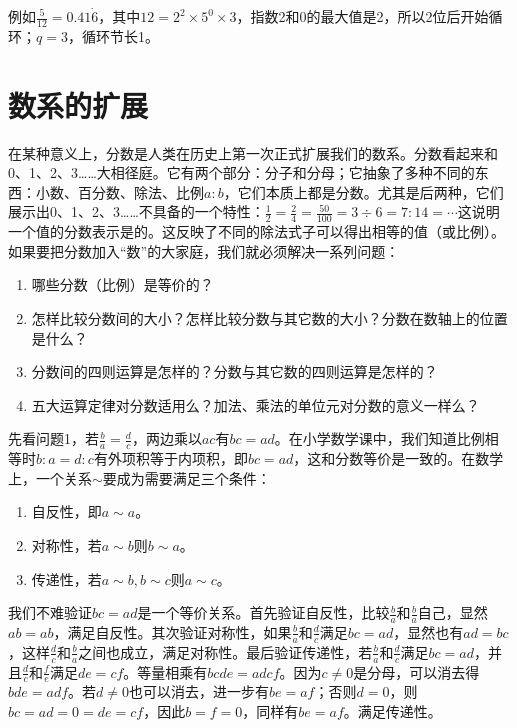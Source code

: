 \documentclass[b5paper]{ctexart}
\begin{document}
例如$\frac{5}{12} = 0.41\dot{6}$，其中$12 = 2^2 \times 5^0 \times 3$，指数2和0的最大值是2，所以2位后开始循环；$q = 3$，循环节长1。

\section{数系的扩展}
在某种意义上，分数是人类在历史上第一次正式扩展我们的数系。分数看起来和0、1、2、3……大相径庭。它有两个部分：分子和分母；它抽象了多种不同的东西：小数、百分数、除法、比例$a:b$，它们本质上都是分数。尤其是后两种，它们展示出0、1、2、3……不具备的一个特性：$\frac{1}{2} = \frac{2}{4} = \frac{50}{100} = 3 \div 6 = 7:14 = \cdots$这说明一个值的分数表示是的。这反映了不同的除法式子可以得出相等的值（或比例）。如果要把分数加入“数”的大家庭，我们就必须解决一系列问题：

\begin{enumerate}[问题1.]
\item 哪些分数（比例）是等价的？
\item 怎样比较分数间的大小？怎样比较分数与其它数的大小？分数在数轴上的位置是什么？
\item 分数间的四则运算是怎样的？分数与其它数的四则运算是怎样的？
\item 五大运算定律对分数适用么？加法、乘法的单位元对分数的意义一样么？
\end{enumerate}

先看问题1，若$\frac{b}{a} = \frac{d}{c}$，两边乘以$ac$有$bc = ad$。在小学数学课中，我们知道比例相等时$b : a = d : c$有外项积等于内项积，即$bc = ad$，这和分数等价是一致的。在数学上，一个关系$\sim$要成为需要满足三个条件：

\begin{enumerate}[条件1.]
\item 自反性，即$a \sim a$。
\item 对称性，若$a \sim b$则$b \sim a$。
\item 传递性，若$a \sim b, b \sim c$则$a \sim c$。
\end{enumerate}

我们不难验证$bc = ad$是一个等价关系。首先验证自反性，比较$\frac{b}{a}$和$\frac{b}{a}$自己，显然$ab = ab$，满足自反性。其次验证对称性，如果$\frac{b}{a}$和$\frac{d}{c}$满足$bc = ad$，显然也有$ad = bc$，这样$\frac{d}{c}$和$\frac{b}{a}$之间也成立，满足对称性。最后验证传递性，若$\frac{b}{a}$和$\frac{d}{c}$满足$bc = ad$，并且$\frac{d}{c}$和$\frac{f}{e}$满足$de = cf$。等量相乘有$bcde = adcf$。因为$c \ne 0$是分母，可以消去得$bde = adf$。若$d \ne 0$也可以消去，进一步有$be = af$；否则$d = 0$，则$bc = ad = 0 = de = cf$，因此$b = f = 0$，同样有$be = af$。满足传递性。
\end{document}
